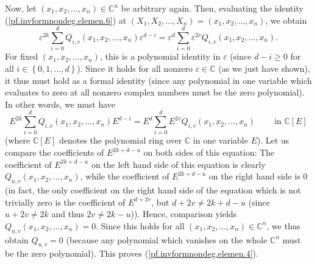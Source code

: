 \documentclass[etingof-lie.tex]{subfiles}
\begin{document}
Now, let $\left(  x_{1},x_{2},...,x_{n}\right)  \in\mathbb{C}^{n}$ be
arbitrary again. Then, evaluating the identity
(\ref{pf.invformnondeg.elemen.6}) at $\left(  X_{1},X_{2},...,X_{n}\right)
=\left(  x_{1},x_{2},...,x_{n}\right)  $, we obtain
\[
\varepsilon^{2k}\sum\limits_{i=0}^{d}Q_{i,v}\left(  x_{1},x_{2},...,x_{n}%
\right)  \varepsilon^{d-i}=\varepsilon^{d}\sum\limits_{i=0}^{d}\varepsilon
^{2v}Q_{i,v}\left(  x_{1},x_{2},...,x_{n}\right)  .
\]
For fixed $\left(  x_{1},x_{2},...,x_{n}\right)  $, this is a polynomial
identity in $\varepsilon$ (since $d-i\geq0$ for all $i\in\left\{
0,1,...,d\right\}  $). Since it holds for all nonzero $\varepsilon
\in\mathbb{C}$ (as we just have shown), it thus must hold as a formal identity
(since any polynomial in one variable which evaluates to zero at all nonzero
complex numbers must be the zero polynomial). In other words, we must have%
\[
E^{2k}\sum\limits_{i=0}^{d}Q_{i,v}\left(  x_{1},x_{2},...,x_{n}\right)
E^{d-i}=E^{d}\sum\limits_{i=0}^{d}E^{2v}Q_{i,v}\left(  x_{1},x_{2}%
,...,x_{n}\right)  \ \ \ \ \ \ \ \ \ \ \text{in }\mathbb{C}\left[  E\right]
\]
(where $\mathbb{C}\left[  E\right]  $ denotes the polynomial ring over
$\mathbb{C}$ in one variable $E$). Let us compare the coefficients of
$E^{2k+d-u}$ on both sides of this equation: The coefficient of $E^{2k+d-u}$
on the left hand side of this equation is clearly $Q_{u,v}\left(  x_{1}%
,x_{2},...,x_{n}\right)  $, while the coefficient of $E^{2k+d-u}$ on the right
hand side is $0$ (in fact, the only coefficient on the right hand side of the
equation which is not trivially zero is the coefficient of $E^{d+2v}$, but
$d+2v\neq2k+d-u$ (since $u+2v\neq2k$ and thus $2v\neq2k-u$)). Hence,
comparison yields $Q_{u,v}\left(  x_{1},x_{2},...,x_{n}\right)  =0$. Since
this holds for all $\left(  x_{1},x_{2},...,x_{n}\right)  \in\mathbb{C}^{n}$,
we thus obtain $Q_{u,v}=0$ (because any polynomial which vanishes on the whole
$\mathbb{C}^{n}$ must be the zero polynomial). This proves
(\ref{pf.invformnondeg.elemen.4}).
\end{document}
